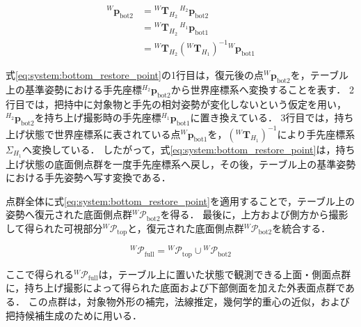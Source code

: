 \begin{equation}
\begin{aligned}
  {}^{W}\bm{p}_{\mathrm{bot2}}
  &=
  {}^{W}\bm{T}_{H_2}
  \,
  {}^{H_2}\bm{p}_{\mathrm{bot2}}
  \\
  &=
  {}^{W}\bm{T}_{H_2}
  \,
  {}^{H_1}\bm{p}_{\mathrm{bot1}}
  \\
  &=
  {}^{W}\bm{T}_{H_2}
  \left(
    {}^{W}\bm{T}_{H_1}
  \right)^{-1}
  {}^{W}\bm{p}_{\mathrm{bot1}}
\end{aligned}
\label{eq:system:bottom_restore_point}
\end{equation}

式\eqref{eq:system:bottom_restore_point}の1行目は，復元後の点${}^{W}\bm{p}_{\mathrm{bot2}}$を，テーブル上の基準姿勢における手先座標${}^{H_2}\bm{p}_{\mathrm{bot2}}$から世界座標系へ変換することを表す．
2行目では，把持中に対象物と手先の相対姿勢が変化しないという仮定を用い，${}^{H_2}\bm{p}_{\mathrm{bot2}}$を持ち上げ撮影時の手先座標${}^{H_1}\bm{p}_{\mathrm{bot1}}$に置き換えている．
3行目では，持ち上げ状態で世界座標系に表されている点${}^{W}\bm{p}_{\mathrm{bot1}}$を，$\left({}^{W}\bm{T}_{H_1}\right)^{-1}$により手先座標系$\Sigma_{H_1}$へ変換している．
したがって，式\eqref{eq:system:bottom_restore_point}は，持ち上げ状態の底面側点群を一度手先座標系へ戻し，その後，テーブル上の基準姿勢における手先姿勢へ写す変換である．

点群全体に式\eqref{eq:system:bottom_restore_point}を適用することで，テーブル上の姿勢へ復元された底面側点群${}^{W}\mathcal{P}_{\mathrm{bot2}}$を得る．
最後に，上方および側方から撮影して得られた可視部分${}^{W}\mathcal{P}_{\mathrm{top}}$と，復元された底面側点群${}^{W}\mathcal{P}_{\mathrm{bot2}}$を統合する．

\begin{equation}
  {}^{W}\mathcal{P}_{\mathrm{full}}
  =
  {}^{W}\mathcal{P}_{\mathrm{top}}
  \cup
  {}^{W}\mathcal{P}_{\mathrm{bot2}}
  \label{eq:system:bottom_full_cloud}
\end{equation}

ここで得られる${}^{W}\mathcal{P}_{\mathrm{full}}$は，テーブル上に置いた状態で観測できる上面・側面点群に，持ち上げ撮影によって得られた底面および下部側面を加えた外表面点群である．
この点群は，対象物外形の補完，法線推定，幾何学的重心の近似，および把持候補生成のために用いる．








































